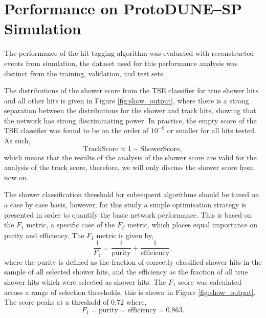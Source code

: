 \section{Performance on ProtoDUNE--SP Simulation} \label{cnn-perf-sim}

The performance of the hit tagging algorithm was evaluated with reconstructed
events from \protodune{} simulation, the dataset used for this performance
analysis was distinct from the training, validation, and test sets. 

The distributions of the shower score from the TSE classifier for true shower 
hits and all other hits is given in Figure \ref{fig:show_output}, where there is a 
strong separation between the distributions for the shower and track hits, 
showing that the network has strong discriminating power. In practice, the 
empty score of the TSE classifier was found to be on the order of $10^{-9}$ or 
smaller for all hits tested. As such,
\begin{equation*}
	\mbox{TrackScore} \approx 1 - \mbox{ShowerScore},
\end{equation*}
which means that the results of the analysis of the shower score are valid for
the analysis of the track score, therefore, we will only discuss the shower 
score from now on.

The shower classification threshold for subsequent algorithms should be tuned on
a case by case basis, however, for this study a simple optimisation strategy 
is presented in order to quantify the basic network performance. This is based
on the $F_1$ metric, a specific case of the $F_\beta$ 
metric\cite{VanRijsbergenC.J.1975Ir}, which places equal importance on 
purity and efficiency. The $F_1$ metric is given by, 
\begin{equation*}
	\frac{1}{F_1} = \frac{1}{\mbox{purity}} + \frac{1}{\mbox{efficiency}},
\end{equation*}
where the purity is defined as the fraction of correctly classified shower 
hits in the sample of all selected shower hits, and the efficiency as the 
fraction of all true shower hits which were selected as shower hits. The $F_1$ 
score was calculated across a range of selection thresholds, this is shown in 
Figure \ref{fig:show_output}. The score peaks at a threshold of 0.72 where, 
\begin{equation*} 
	F_1 = \mbox{purity} = \mbox{efficiency} = 0.863.  
\end{equation*}

